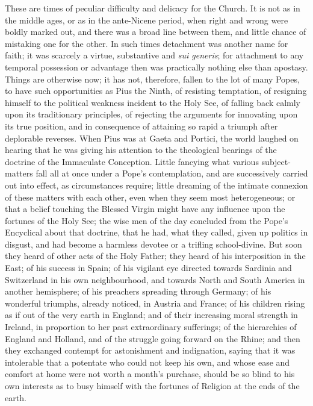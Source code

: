 These are times of peculiar difficulty and delicacy for the Church.
It is not as in the middle ages, or as in the ante-Nicene period, when
right and wrong were boldly marked out, and there was a broad line
between them, and little chance of mistaking one for the other. In
such times detachment was another name for faith; it was
scarcely a virtue, substantive and \emph{sui generis}; for attachment
to any temporal possession or advantage then was practically nothing
else than apostasy. Things are otherwise now; it has not, therefore,
fallen to the lot of many Popes, to have such opportunities as Pius
the Ninth, of resisting temptation, of resigning himself to the
political weakness incident to the Holy See, of falling back calmly
upon its traditionary principles, of rejecting the arguments for
innovating upon its true position, and in consequence of attaining so
rapid a triumph after deplorable reverses. When Pius was at Gaeta and
Portici, the world laughed on hearing that he was giving his attention
to the theological bearings of the doctrine of the Immaculate
Conception. Little fancying what various subject-matters fall all at
once under a Pope's contemplation, and are successively carried out
into effect, as circumstances require; little dreaming of the intimate
connexion of these matters with each other, even when they seem most
heterogeneous; or that a belief touching the Blessed Virgin might have
any influence upon the fortunes of the Holy See; the wise men of the
day concluded from the Pope's Encyclical about that doctrine, that he
had, what they called, given up politics in disgust, and had become a
harmless devotee or a trifling school-divine. But soon they heard of
other acts of the Holy Father; they heard of his interposition in the
East; of his success in Spain; of his vigilant eye directed towards
Sardinia and Switzerland in his own neighbourhood, and towards North
and South America in another hemisphere; of his preachers spreading
through Germany; of his wonderful triumphs, already noticed, in
Austria and France; of his children rising as if out of the very earth
in England; and of their increasing moral strength in Ireland, in
proportion to her past extraordinary sufferings; of the
hierarchies of England and Holland, and of the struggle going forward
on the Rhine; and then they exchanged contempt for astonishment and
indignation, saying that it was intolerable that a potentate who could
not keep his own, and whose ease and comfort at home were not worth a
month's purchase, should be so blind to his own interests as to busy
himself with the fortunes of Religion at the ends of the earth.

